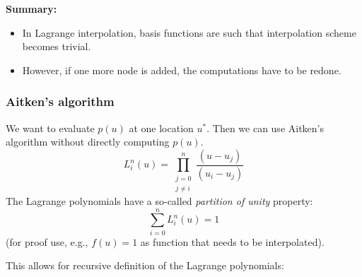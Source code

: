 \textbf{Summary:}
\begin{itemize}
    \item {
        In Lagrange interpolation, basis functions are such that interpolation scheme becomes trivial.
    }
    \item {
        However, if one more node is added, the computations have to be redone.
    }
\end{itemize}

\subsubsection{Aitken's algorithm}
We want to evaluate $p(u)$ at one location $u^*$.
Then we can use Aitken's algorithm without directly computing $p(u)$.
\[
    L_i^n(u) = \prod_{\substack{j=0 \\ j \ne i}}^n 
    \frac{(u - u_j)}{(u_i - u_j)}
\]
The Lagrange polynomials have a so-called \textit{partition of unity} property:
\[
    \sum_{i=0}^n L_i^n(u) = 1
\]
(for proof use, e.g., $f(u) = 1$ as function that needs to be interpolated).

This allows for recursive definition of the Lagrange polynomials:

